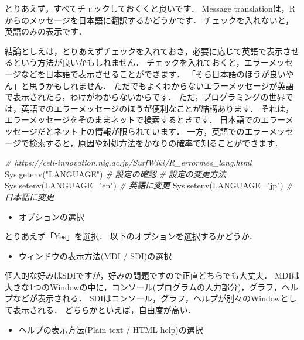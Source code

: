 \documentclass[
]{article}
\newenvironment{Shaded}{\begin{snugshade}}{\end{snugshade}}
\newcommand{\AttributeTok}[1]{\textcolor[rgb]{0.77,0.63,0.00}{#1}}
\newcommand{\CommentTok}[1]{\textcolor[rgb]{0.56,0.35,0.01}{\textit{#1}}}
\newcommand{\FunctionTok}[1]{\textcolor[rgb]{0.00,0.00,0.00}{#1}}
\newcommand{\NormalTok}[1]{#1}
\newcommand{\StringTok}[1]{\textcolor[rgb]{0.31,0.60,0.02}{#1}}
\providecommand{\tightlist}{%
  \setlength{\itemsep}{0pt}\setlength{\parskip}{0pt}}
\begin{document}
とりあえず，すべてチェックしておくくと良いです．
Message translationは，Rからのメッセージを日本語に翻訳するかどうかです．
チェックを入れないと，英語のみの表示です．

結論としえは，とりあえずチェックを入れておき，必要に応じて英語で表示させるという方法が良いかもしれません．
チェックを入れておくと，エラーメッセージなどを日本語で表示させることができます．
「そら日本語のほうが良いやん」と思うかもしれません．
ただでもよくわからないエラーメッセージが英語で表示されたら，わけがわからないからです．
ただ，プログラミングの世界では，英語でのエラーメッセージのほうが便利なことが結構あります．
それは，エラーメッセージをそのままネットで検索するときです．
日本語でのエラーメッセージだとネット上の情報が限られています．
一方，英語でのエラーメッセージで検索すると，原因や対処方法をかなりの確率で知ることができます．

\begin{Shaded}
\begin{Highlighting}[]
  \CommentTok{\# https://cell{-}innovation.nig.ac.jp/SurfWiki/R\_errormes\_lang.html}
  \FunctionTok{Sys.getenv}\NormalTok{(}\StringTok{"LANGUAGE"}\NormalTok{) }\CommentTok{\# 設定の確認}
  \CommentTok{\# 設定の変更方法}
  \FunctionTok{Sys.setenv}\NormalTok{(}\AttributeTok{LANGUAGE=}\StringTok{"en"}\NormalTok{) }\CommentTok{\# 英語に変更}
  \FunctionTok{Sys.setenv}\NormalTok{(}\AttributeTok{LANGUAGE=}\StringTok{"jp"}\NormalTok{) }\CommentTok{\# 日本語に変更}
\end{Highlighting}
\end{Shaded}

\begin{itemize}
\tightlist
\item
  オプションの選択
\end{itemize}

とりあえず「Yes」を選択．
以下のオプションを選択するかどうか．

\begin{itemize}
\tightlist
\item
  ウィンドウの表示方法(MDI / SDI)の選択
\end{itemize}

個人的な好みはSDIですが，好みの問題ですので正直どちらでも大丈夫．
MDIは大きな1つのWindowの中に，コンソール(プログラムの入力部分)，グラフ，ヘルプなどが表示される．
SDIはコンソール，グラフ，ヘルプが別々のWindowとして表示される．
どちらかといえば，自由度が高い．

\begin{itemize}
\tightlist
\item
  ヘルプの表示方法(Plain text / HTML help)の選択
\end{itemize}
\end{document}
